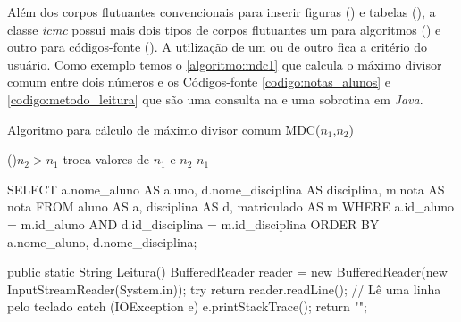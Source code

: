 Além dos corpos flutuantes convencionais para inserir figuras () e tabelas (), a classe \textit{icmc} possui mais dois tipos de corpos flutuantes um para algoritmos () e outro para códigos-fonte (). A utilização de um ou de outro fica a critério do usuário. Como exemplo temos o \autoref{algoritmo:mdc1} que calcula o máximo divisor comum entre dois números e os Códigos-fonte \ref{codigo:notas_alunos} e \ref{codigo:metodo_leitura} que são uma consulta na  e uma sobrotina em \textit{Java}.

\begin{algoritmo}
\caption{Algoritmo para cálculo de máximo divisor comum MDC($n_1$,$n_2$)}
\label{algoritmo:mdc1}

 \If(){$n_2 > n_1$}
   {troca valores de $n_1$ e $n_2$}
 \Return $n_1$
\end{algoritmo}

\begin{codigo}[caption = {Consulta SQL}, label={codigo:notas_alunos},language=SQL, breaklines=true]
SELECT a.nome_aluno AS aluno,
       d.nome_disciplina AS disciplina,
       m.nota AS nota
FROM aluno AS a,
     disciplina AS d,
     matriculado AS m
WHERE a.id_aluno = m.id_aluno
  AND d.id_disciplina = m.id_disciplina
ORDER BY a.nome_aluno, d.nome_disciplina;
\end{codigo}

\begin{codigo}[caption={Subrotina para obter uma entrada do usuário}, label={codigo:metodo_leitura}, language=Java, breaklines=true]
public static String Leitura(){
    BufferedReader reader = new BufferedReader(new InputStreamReader(System.in));
    try {
        return reader.readLine(); // Lê uma linha pelo teclado
    } catch (IOException e) {
        e.printStackTrace();
        return "";
    }
}
\end{codigo}

